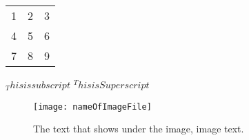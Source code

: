 \documentclass[12pt, a4paper]{article}
\begin{document}
\begin{tabular}{ l c r }
  1 & 2 & 3 \\
  4 & 5 & 6 \\
  7 & 8 & 9 \\
\end{tabular}

$_This is subscript$
$^This is Superscript$

\begin{figure}[htb]
    \centering
    \texttt{[image: nameOfImageFile]} 
    \caption{The text that shows under the image, image text.}
    \label{fig:FigureLableName}
\end{figure}




\end{document}
